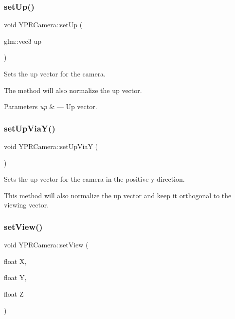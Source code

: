 \subsubsection{\texorpdfstring{set\+Up()}{setUp()}\hspace{0.1cm}{\footnotesize\ttfamily [2/2]}}
{\footnotesize\ttfamily void Y\+P\+R\+Camera\+::set\+Up (\begin{DoxyParamCaption}\item[{glm\+::vec3}]{up }\end{DoxyParamCaption})}



Sets the up vector for the camera. 

The method will also normalize the up vector.


\begin{DoxyParams}{Parameters}
{\em up} & --- Up vector. \\
\hline
\end{DoxyParams}
\mbox{\label{class_y_p_r_camera_a1f704e1375b335a01d6b8bb9affecce1}} 
\subsubsection{\texorpdfstring{set\+Up\+Via\+Y()}{setUpViaY()}}
{\footnotesize\ttfamily void Y\+P\+R\+Camera\+::set\+Up\+ViaY (\begin{DoxyParamCaption}{ }\end{DoxyParamCaption})}



Sets the up vector for the camera in the positive y direction. 

This method will also normalize the up vector and keep it orthogonal to the viewing vector. \mbox{\label{class_y_p_r_camera_a18213984138d7dd35a8434cf80b8acb0}} 
\subsubsection{\texorpdfstring{set\+View()}{setView()}\hspace{0.1cm}{\footnotesize\ttfamily [1/2]}}
{\footnotesize\ttfamily void Y\+P\+R\+Camera\+::set\+View (\begin{DoxyParamCaption}\item[{float}]{X,  }\item[{float}]{Y,  }\item[{float}]{Z }\end{DoxyParamCaption})}



